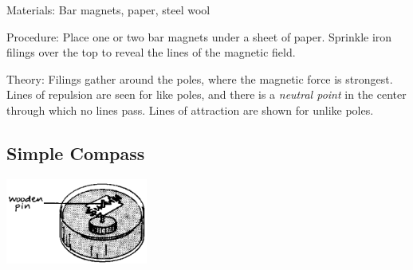 \begin{multicols}{2}
\begin{description*}
\item[Materials:]{Bar magnets, paper, steel wool}
\item[Procedure:]{Place one or two bar magnets under a sheet of paper. Sprinkle iron filings over the top to reveal the lines of the magnetic field.}
\item[Theory:]{Filings gather around the poles, where the magnetic force is strongest. Lines of repulsion are seen for like poles, and there is a \emph{neutral point} in the center through which no lines pass. Lines of attraction are shown for unlike poles.}
\end{description*}

\columnbreak

\subsection{Simple Compass} 

\begin{center}
\includegraphics[width=0.35\textwidth]{./img/source/compass.png}
\end{center}


\end{multicols}
